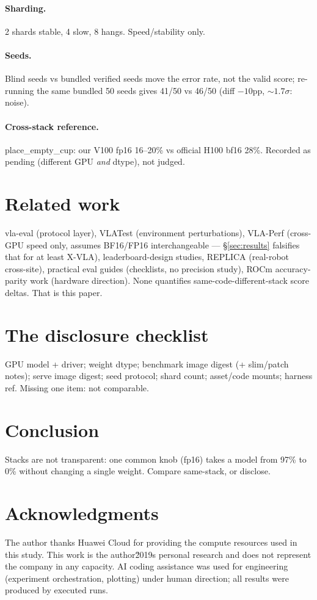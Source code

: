 \documentclass{article}
\begin{document}
\paragraph{Sharding.} 2 shards stable, 4 slow, 8 hangs. Speed/stability only.

\paragraph{Seeds.} Blind seeds vs bundled verified seeds move the error rate,
not the valid score; re-running the same bundled 50 seeds gives 41/50 vs
46/50 (diff $-10$pp, ${\sim}1.7\sigma$: noise).

\paragraph{Cross-stack reference.} place\_empty\_cup: our V100 fp16 16--20\%
vs official H100 bf16 28\%. Recorded as pending (different GPU \emph{and}
dtype), not judged.

\section{Related work}
vla-eval (protocol layer), VLATest (environment perturbations),
VLA-Perf (cross-GPU speed only, assumes BF16/FP16 interchangeable --- \S\ref{sec:results}
falsifies that for at least X-VLA), leaderboard-design studies, REPLICA
(real-robot cross-site), practical eval guides (checklists, no precision
study), ROCm accuracy-parity work (hardware direction). None quantifies
same-code-different-stack score deltas. That is this paper.

\section{The disclosure checklist}
GPU model + driver; weight dtype; benchmark image digest (+ slim/patch
notes); serve image digest; seed protocol; shard count; asset/code mounts;
harness ref. Missing one item: not comparable.

\section{Conclusion}
Stacks are not transparent: one common knob (fp16) takes a model from 97\%
to 0\% without changing a single weight. Compare same-stack, or disclose.

\section*{Acknowledgments}
The author thanks Huawei Cloud for providing the compute resources used in this study. This work is the author\u2019s personal research and does not represent the company in any capacity. AI coding assistance was used for
engineering (experiment orchestration, plotting) under human direction; all
results were produced by executed runs.
\end{document}
